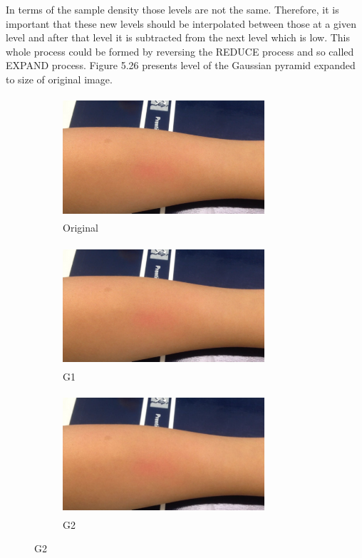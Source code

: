 In terms of the sample density those levels are not the same. Therefore, it is important that these new levels should be interpolated
between those at a given level and after that level it is subtracted from the next level which is low. This whole process could be formed by reversing the REDUCE process and so called EXPAND process. Figure 5.26 presents level of the Gaussian pyramid expanded to size of original image.\\
 \begin{figure}[!h]
\centering
\begin{subfigure}{.5\textwidth}
  \centering
  \includegraphics[width=7.5cm,height=4.5cm]{img/eulerian/sample/test}
  \caption{Original}
  \label{fig:sub1}
\end{subfigure}%
\begin{subfigure}{.5\textwidth}
  \centering
  \includegraphics[width=7.5cm,height=4.5cm]{img/eulerian/sample/0}
  \caption{G1}
  \label{fig:sub2}
\end{subfigure}
\begin{subfigure}{.5\textwidth}
  \centering
  \includegraphics[width=7.5cm,height=4.5cm]{img/eulerian/sample/1}
  \caption{G2}
  \label{fig:sub2}

\end{subfigure}
\end{figure}
